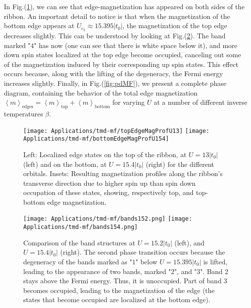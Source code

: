 In Fig.(\ref{fig:wfs1}), we can see that edge-magnetization has appeared on both sides of the ribbon.
An important detail to notice is that when the magnetization of the bottom edge appears at $U_{c_2} \approx 15.395 |t_0|$, the magnetization of the top edge decreases slightly.
This can be understood by looking at Fig.(\ref{fig:bandDegen}).
The band marked "$4$" has now  (one can see that there is white space below it), and more down spin states localized at the top edge become occupied, canceling out some of the magnetization induced by their corresponding up spin states.
This effect occurs because, along with the lifting of the degeneracy, the Fermi energy increases slightly.
Finally, in Fig.(\ref{fig:pdMF}), we present a complete phase diagram, containing the behavior of the total edge magnetization $\left\langle m \right\rangle_{\text{edges}} = \left\langle m \right\rangle_{\text{top}} + \left\langle m \right\rangle_{\text{bottom}}$ for varying $U$ at a number of different inverse temperatures $\beta$.
\begin{figure}[H]
\hspace{0.8cm}
\texttt{[image: Applications/tmd-mf/topEdgeMagProfU13]}
\texttt{[image: Applications/tmd-mf/bottomEdgeMagProfU154]}
	\caption[Localized edge states on the top and on the bottom of the ribbon for the different orbitals. Resulting magnetization profile along the ribbon's transverse direction due to higher spin up than spin down occupation.]{Left: Localized edge states on the top of the ribbon, at $U = 13 |t_0|$ (left) and on the bottom, at $U = 15.4 |t_0|$ (right) for the different orbitals. Insets: Resulting magnetization profiles along the ribbon's transverse direction due to higher spin up than spin down occupation of these states, showing, respectively top, and top-bottom edge magnetization.}
	\label{fig:wfs1}
\end{figure}
\vspace{-0.5cm}
\begin{figure}[H]
\hspace{0.3cm}
\texttt{[image: Applications/tmd-mf/bands152.png]}
\hspace{8mm}
\texttt{[image: Applications/tmd-mf/bands154.png]}
	\caption[Comparison of the band structures at $U = 15.2| t_0 |$, and $U=15.4| t_0 |$.]{Comparison of the band structures at $U = 15.2| t_0 |$ (left), and $U=15.4| t_0 |$ (right). The second phase transition occurs because the degeneracy of the bands marked as "$1$" below $U = 15.395 | t_0 |$ is lifted, leading to the appearance of two bands, marked "$2$", and "$3$". Band 2 stays above the Fermi energy. Thus, it is unoccupied. Part of band 3 becomes occupied, leading to the magnetization of the edge (the states that become occupied are localized at the bottom edge).}
	\label{fig:bandDegen}
\end{figure}

